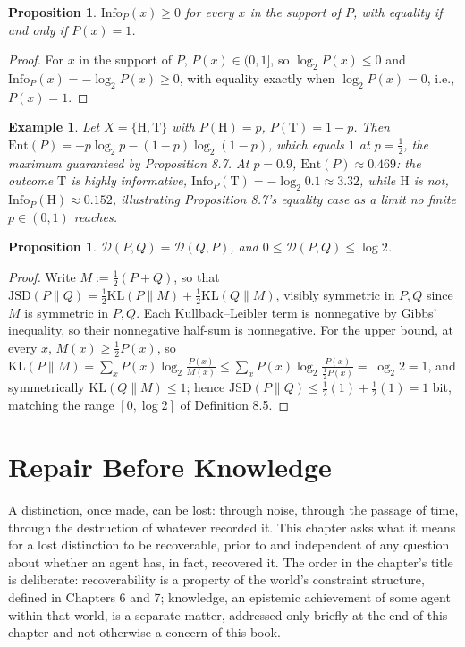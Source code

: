 \documentclass[11pt]{book}
\newtheorem{proposition}[theorem]{Proposition}
\newtheorem{example}[theorem]{Example}
\begin{document}
\begin{proposition}
$\mathrm{Info}_P(x) \geq 0$ for every $x$ in the support of $P$, with equality if and only if $P(x) = 1$.
\end{proposition}

\begin{proof}
For $x$ in the support of $P$, $P(x) \in (0,1]$, so $\log_2 P(x) \leq 0$ and $\mathrm{Info}_P(x) = -\log_2 P(x) \geq 0$, with equality exactly when $\log_2 P(x) = 0$, i.e., $P(x) = 1$.
\end{proof}

\begin{example}
Let $X = \{\mathrm H, \mathrm T\}$ with $P(\mathrm H) = p$, $P(\mathrm T) = 1-p$. Then $\mathrm{Ent}(P) = -p\log_2 p - (1-p)\log_2(1-p)$, which equals $1$ at $p = \tfrac12$, the maximum guaranteed by Proposition 8.7. At $p = 0.9$, $\mathrm{Ent}(P) \approx 0.469$: the outcome $\mathrm T$ is highly informative, $\mathrm{Info}_P(\mathrm T) = -\log_2 0.1 \approx 3.32$, while $\mathrm H$ is not, $\mathrm{Info}_P(\mathrm H) \approx 0.152$, illustrating Proposition 8.7's equality case as a limit no finite $p \in (0,1)$ reaches.
\end{example}

\begin{proposition}
$\mathcal D(P,Q) = \mathcal D(Q,P)$, and $0 \leq \mathcal D(P,Q) \leq \log 2$.
\end{proposition}

\begin{proof}
Write $M := \tfrac12(P+Q)$, so that $\mathrm{JSD}(P\|Q) = \tfrac12 \mathrm{KL}(P\|M) + \tfrac12 \mathrm{KL}(Q\|M)$, visibly symmetric in $P,Q$ since $M$ is symmetric in $P,Q$. Each Kullback–Leibler term is nonnegative by Gibbs' inequality, so their nonnegative half-sum is nonnegative. For the upper bound, at every $x$, $M(x) \geq \tfrac12 P(x)$, so $\mathrm{KL}(P\|M) = \sum_x P(x)\log_2 \frac{P(x)}{M(x)} \leq \sum_x P(x) \log_2 \frac{P(x)}{\tfrac12 P(x)} = \log_2 2 = 1$, and symmetrically $\mathrm{KL}(Q\|M) \leq 1$; hence $\mathrm{JSD}(P\|Q) \leq \tfrac12(1) + \tfrac12(1) = 1$ bit, matching the range $[0, \log 2]$ of Definition 8.5.
\end{proof}

\chapter{Repair Before Knowledge}

A distinction, once made, can be lost: through noise, through the passage of time, through the destruction of whatever recorded it. This chapter asks what it means for a lost distinction to be recoverable, prior to and independent of any question about whether an agent has, in fact, recovered it. The order in the chapter's title is deliberate: recoverability is a property of the world's constraint structure, defined in Chapters 6 and 7; knowledge, an epistemic achievement of some agent within that world, is a separate matter, addressed only briefly at the end of this chapter and not otherwise a concern of this book.
\end{document}
